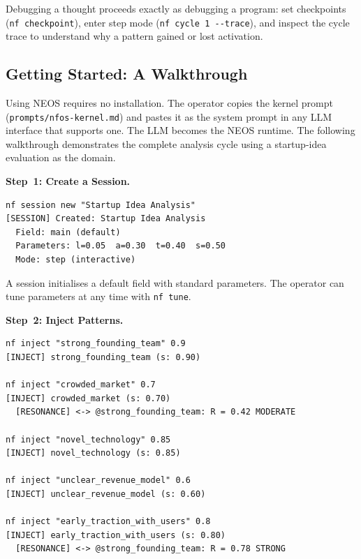 \noindent
Debugging a thought proceeds exactly as debugging a program: set
checkpoints (\texttt{nf checkpoint}), enter step mode
(\texttt{nf cycle 1 -{}-trace}), and inspect the cycle trace to
understand why a pattern gained or lost activation.

\subsection{Getting Started: A Walkthrough}\label{sec:tutorial}

Using NEOS requires no installation.  The operator copies the kernel
prompt (\texttt{prompts/nfos-kernel.md}) and pastes it as the system
prompt in any LLM interface that supports one.  The LLM becomes the
NEOS runtime.  The following walkthrough demonstrates the complete
analysis cycle using a startup-idea evaluation as the domain.

\bigskip\noindent\textbf{Step~1: Create a Session.}
\nopagebreak[4]\smallskip

\begin{terminalbox}
\begin{lstlisting}[style=neosshell]
nf session new "Startup Idea Analysis"
[SESSION] Created: Startup Idea Analysis
  Field: main (default)
  Parameters: l=0.05  a=0.30  t=0.40  s=0.50
  Mode: step (interactive)
\end{lstlisting}
\end{terminalbox}

\noindent
A session initialises a default field with standard
parameters.  The operator can tune parameters at any time with
\texttt{nf tune}.

\bigskip\noindent\textbf{Step~2: Inject Patterns.}
\nopagebreak[4]\smallskip

\begin{terminalbox}
\begin{lstlisting}[style=neosshell]
nf inject "strong_founding_team" 0.9
[INJECT] strong_founding_team (s: 0.90)

nf inject "crowded_market" 0.7
[INJECT] crowded_market (s: 0.70)
  [RESONANCE] <-> @strong_founding_team: R = 0.42 MODERATE

nf inject "novel_technology" 0.85
[INJECT] novel_technology (s: 0.85)

nf inject "unclear_revenue_model" 0.6
[INJECT] unclear_revenue_model (s: 0.60)

nf inject "early_traction_with_users" 0.8
[INJECT] early_traction_with_users (s: 0.80)
  [RESONANCE] <-> @strong_founding_team: R = 0.78 STRONG
\end{lstlisting}
\end{terminalbox}

